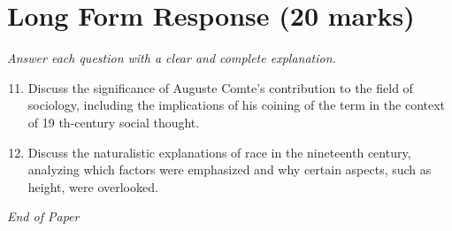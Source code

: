 \documentclass[12pt]{article}
\begin{document}
\section*{Long Form Response (20 marks)}
\textit{Answer each question with a clear and complete explanation.}
\begin{enumerate}[label=\arabic*.]
\setcounter{enumi}{10}
\item Discuss the significance of Auguste Comte's contribution to the field of sociology, including the implications of his coining of the term in the context of 19 th-century social thought.
\item Discuss the naturalistic explanations of race in the nineteenth century, analyzing which factors were emphasized and why certain aspects, such as height, were overlooked.
\end{enumerate}

\vfill
\noindent\textit{End of Paper}
\end{document}
